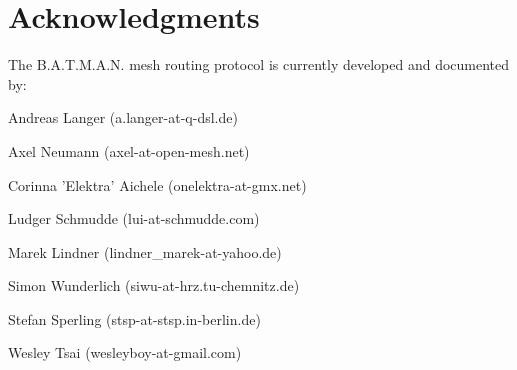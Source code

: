 \documentclass[11pt]{article}
\begin{document}
\section {Acknowledgments}
\label{sec:acks}

The B.A.T.M.A.N. mesh routing protocol is currently developed and documented by:

Andreas Langer (a.langer-at-q-dsl.de)

Axel Neumann (axel-at-open-mesh.net)

Corinna 'Elektra' Aichele (onelektra-at-gmx.net)

Ludger Schmudde (lui-at-schmudde.com)

Marek Lindner (lindner\_marek-at-yahoo.de)

Simon Wunderlich (siwu-at-hrz.tu-chemnitz.de)

Stefan Sperling (stsp-at-stsp.in-berlin.de)

Wesley Tsai (wesleyboy-at-gmail.com)









%
\end{document}
